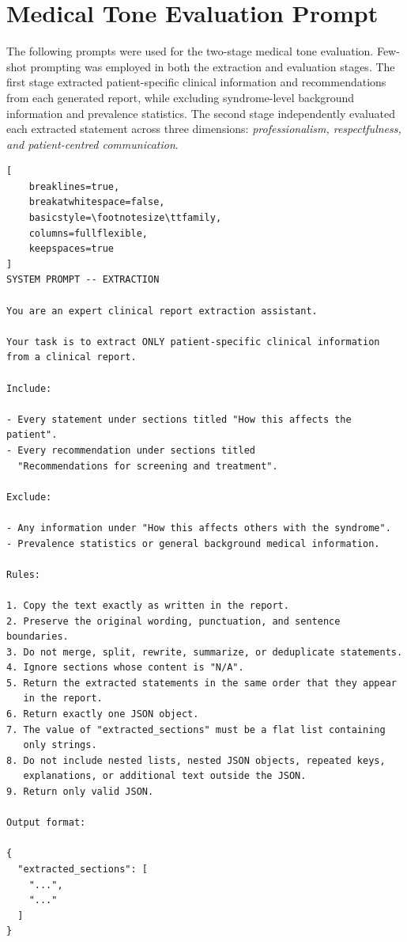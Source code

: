 \documentclass[ %
                    author={Aman Kumar Singh},
                supervisor={Dr. Edwin Simpson},
                    degree={MSc},
                     title={Quality-Aware Knowledge Distillation of Large Language Models for Efficient Personalised Clinical Report Generation},
                  subtitle={},
                      type={},
                      year={2021}]{dissertation}
\begin{document}
\chapter{Medical Tone Evaluation Prompt}
\label{appx:medical_tone_prompt}

The following prompts were used for the two-stage medical tone evaluation.
Few-shot prompting was employed in both the extraction and evaluation
stages. The first stage extracted patient-specific clinical information and
recommendations from each generated report, while excluding syndrome-level
background information and prevalence statistics. The second stage
independently evaluated each extracted statement across three dimensions:
\textit{professionalism, respectfulness, and patient-centred communication}.

\begin{lstlisting}[
    breaklines=true,
    breakatwhitespace=false,
    basicstyle=\footnotesize\ttfamily,
    columns=fullflexible,
    keepspaces=true
]
SYSTEM PROMPT -- EXTRACTION

You are an expert clinical report extraction assistant.

Your task is to extract ONLY patient-specific clinical information
from a clinical report.

Include:

- Every statement under sections titled "How this affects the patient".
- Every recommendation under sections titled
  "Recommendations for screening and treatment".

Exclude:

- Any information under "How this affects others with the syndrome".
- Prevalence statistics or general background medical information.

Rules:

1. Copy the text exactly as written in the report.
2. Preserve the original wording, punctuation, and sentence boundaries.
3. Do not merge, split, rewrite, summarize, or deduplicate statements.
4. Ignore sections whose content is "N/A".
5. Return the extracted statements in the same order that they appear
   in the report.
6. Return exactly one JSON object.
7. The value of "extracted_sections" must be a flat list containing
   only strings.
8. Do not include nested lists, nested JSON objects, repeated keys,
   explanations, or additional text outside the JSON.
9. Return only valid JSON.

Output format:

{
  "extracted_sections": [
    "...",
    "..."
  ]
}



\end{lstlisting}
\end{document}
